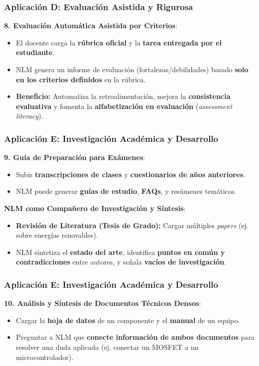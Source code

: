 \documentclass[aspectratio=43]{beamer}
\begin{document}
\begin{frame}
\frametitle{ Aplicación D: Evaluación Asistida y Rigurosa}

\textbf{8. Evaluación Automática Asistida por Criterios}:
\begin{itemize}
    \item El docente carga la \textbf{rúbrica oficial} y la \textbf{tarea entregada por el estudiante}.
    \item NLM genera un informe de evaluación (fortalezas/debilidades) basado \textbf{solo en los criterios definidos} en la rúbrica.
    \item \textbf{Beneficio:} Automatiza la retroalimentación, mejora la \textbf{consistencia evaluativa} y fomenta la \textbf{alfabetización en evaluación} (\textit{assessment literacy}).
\end{itemize}

\end{frame}

\begin{frame}
\frametitle{ Aplicación E: Investigación Académica y Desarrollo}
\textbf{9. Guía de Preparación para Exámenes}:
\begin{itemize}
    \item Subir \textbf{transcripciones de clases} y \textbf{cuestionarios de años anteriores}.
    \item NLM puede generar \textbf{guías de estudio}, \textbf{FAQs}, y resúmenes temáticos.
\end{itemize}

\textbf{NLM como Compañero de Investigación y Síntesis}:
\begin{itemize}
    \item \textbf{Revisión de Literatura (Tesis de Grado):} Cargar múltiples \textit{papers} (ej. sobre energías renovables).
    \item NLM sintetiza el \textbf{estado del arte}, identifica \textbf{puntos en común y contradicciones} entre autores, y señala \textbf{vacíos de investigación}.
\end{itemize}
\end{frame}

\begin{frame}
  \frametitle{ Aplicación E: Investigación Académica y Desarrollo}
\textbf{10. Análisis y Síntesis de Documentos Técnicos Densos}:
\begin{itemize}
    \item Cargar la \textbf{hoja de datos} de un componente y el \textbf{manual} de un equipo.
    \item Preguntar a NLM que \textbf{conecte información de ambos documentos} para resolver una duda aplicada (ej. conectar un MOSFET a un microcontrolador).
\end{itemize}
\end{frame}
\end{document}
